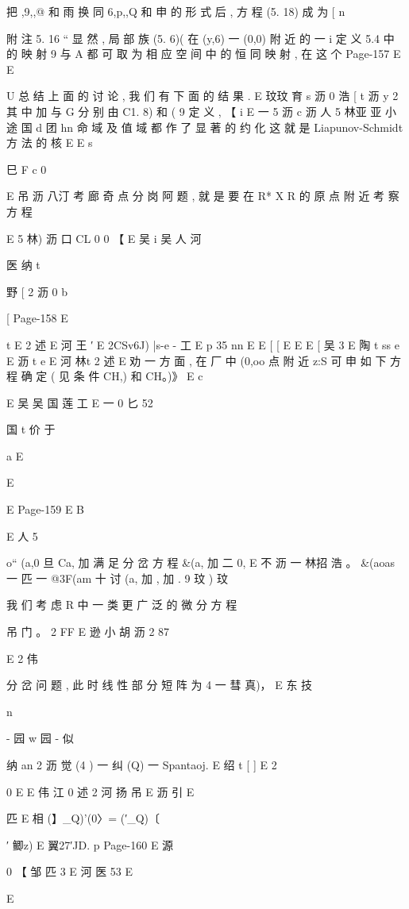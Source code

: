 {{{{{{{{{{{{{{{{{把 ,9,,@ 和 雨 换 同 6,p,,Q 和 申 的 形 式 后 , 方 程 (5. 18) 成 为
[ n

附 注 5. 16 “ 显 然 , 局 部 族 (5. 6)( 在 (y,6) 一 (0,0) 附 近 的 一
i
定 义 5.4 中 的 映 射 9 与 A 都 可 取 为 相 应 空 间 中 的 恒 同 映 射 , 在 这 个
Page-157
E E

U
总 结 上 面 的 讨 论 , 我 们 有 下 面 的 结 果 .
E 玟玟 育 s 沥 0 浩
[ t
沥 y
2
其 中 加 与 G 分 别 由 C1. 8) 和 ( 9 定 义 , 【
i
E 一 5 沥 c 沥 人 5 林亚 亚 小 途 国
d 团 hn 命
域 及 值 域 都 作 了 显 著 的 约 化 这 就 是 Liapunov-Schmidt 方 法 的 核
E
E
s

巳
F c 0

E 吊 沥 八汀
考 廊 奇 点 分 岗 阿 题 , 就 是 要 在 R* X R 的 原 点 附 近 考 察 方 程

E 5 林) 沥 口 CL 0
0
【
E 吴 i 吴
人 河

医 纳 t

野
[ 2 沥 0
b

[
Page-158
E

t
E 2 述
E 河 王 ′
E
2CSv6J) |s-e -
工
E p 35 nn
E
E
[ [
E
E
E
[ 吴 3
E
陶 t ss e
E 沥 t e
E 河 林t
2 述
E
劝 一 方 面 , 在 厂 中 (0,oo 点 附 近 z:S 可 申 如 下 方 程 确 定 ( 见
条 件 CH,) 和 CH。)》
E c

E 吴 吴 国 莲 工
E 一 0 匕 52

国 t
价 于

a E

E

E
Page-159
E B

E 人 5

o“ (a,0 旦 Ca, 加 满 足 分 岔 方 程
&(a, 加 二 0,
E 不 沥 一 林招 浩 。
&(aoas 一 匹 一 @3F(am 十 讨 (a, 加 , 加 . 9 玟 )
玟

我 们 考 虑 R 中 一 类 更 广 泛 的 微 分 方 程

吊
门 。 2
FF E 逊 小 胡 沥 2 87

E 2 伟

分 岔 问 题 , 此 时 线 性 部 分 短 阵 为 4 一 彗 真)， E 东 技

n

- 园 w 园 - 似

纳 an 2 沥
觉 (4 ) 一 纠 (Q) 一 Spantaoj.
E 绍 t [ ] E 2

0
E
E 伟 江
0 述 2 河 扬 吊
E 沥 引
E

匹 E
相 (】_Q)'(0〉= (′_Q)〔

′ 鲫z) E 翼27′JD.
p
Page-160
E 源

0 【
邹 匹
3 E
河
医
53 E

E

}}}}}}}}}}}}}}}}}
